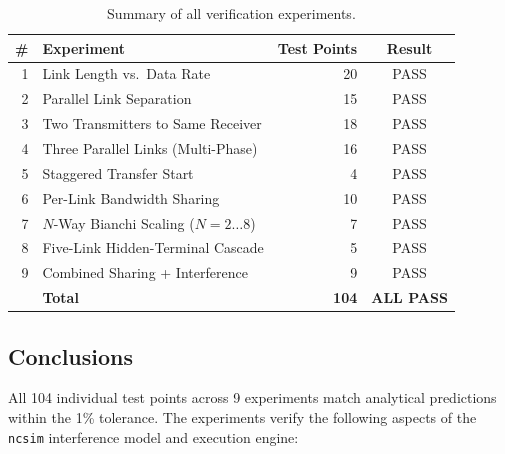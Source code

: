 \documentclass[11pt,a4paper]{article}
\newcommand{\ncsim}{\texttt{ncsim}}
\begin{document}
\begin{table}[h]
\centering
\caption{Summary of all verification experiments.}
\label{tab:summary}
\begin{tabular}{rlrc}
\toprule
\# & Experiment & Test Points & Result \\
\midrule
1 & Link Length vs.\ Data Rate & 20 & PASS \\
2 & Parallel Link Separation & 15 & PASS \\
3 & Two Transmitters to Same Receiver & 18 & PASS \\
4 & Three Parallel Links (Multi-Phase) & 16 & PASS \\
5 & Staggered Transfer Start & 4 & PASS \\
6 & Per-Link Bandwidth Sharing & 10 & PASS \\
7 & $N$-Way Bianchi Scaling ($N=2\ldots 8$) & 7 & PASS \\
8 & Five-Link Hidden-Terminal Cascade & 5 & PASS \\
9 & Combined Sharing + Interference & 9 & PASS \\
\midrule
& \textbf{Total} & \textbf{104} & \textbf{ALL PASS} \\
\bottomrule
\end{tabular}
\end{table}

\subsection{Conclusions}

All 104 individual test points across 9 experiments match analytical predictions within the 1\% tolerance. The experiments verify the following aspects of the \ncsim{} interference model and execution engine:
\end{document}
